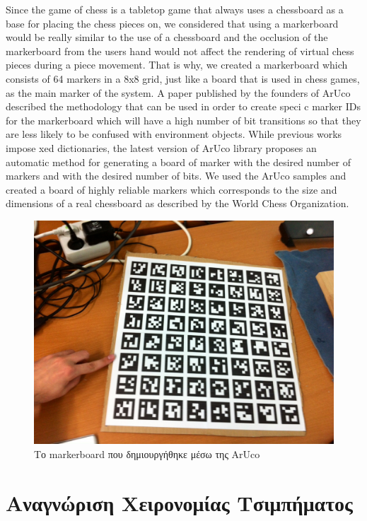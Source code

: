 Since the game of chess is a tabletop game that always uses a chessboard as a base for placing the chess pieces on, we considered that using a markerboard would be really similar to the use of a chessboard and the occlusion of the markerboard from the users hand would not affect the rendering of virtual chess pieces during a piece movement. That is why, we created a markerboard which consists of 64 markers in a 8x8 grid, just like a board that is used in chess games, as the main marker of the system. A paper published by the founders of ArUco described the methodology that can be used in order to create speci c marker IDs for the markerboard which will have a high number of bit transitions so that they are less likely to be confused with environment objects. While previous works impose xed dictionaries, the latest version of ArUco library proposes an automatic method for generating a board of marker with the desired number of markers and with the desired number of bits. We used the ArUco samples and created a board of highly reliable markers which corresponds to the size and dimensions of a real chessboard as described by the World Chess Organization.

\begin{figure}[H]
    \centering
    \includegraphics[scale=0.1, angle=0]{Files/Figures/markerboard.jpg}
    \caption[Το markerboard που δημιουργήθηκε μέσω της ArUco]{Το markerboard που δημιουργήθηκε μέσω της ArUco}
    \label{fig:ps3game}
\end{figure}

\section{Αναγνώριση Χειρονομίας Τσιμπήματος}



